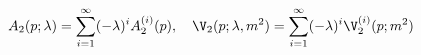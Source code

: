 \begin{equation}
A_2 (p; \lambda) = \sum_{i=1}^\infty (- \lambda)^i A_2^{(i)} (p),\quad
\V_2 (p; \lambda,m^2) = \sum_{i=1}^\infty (- \lambda)^i \V_2^{(i)} (p; m^2)
\end{equation}

